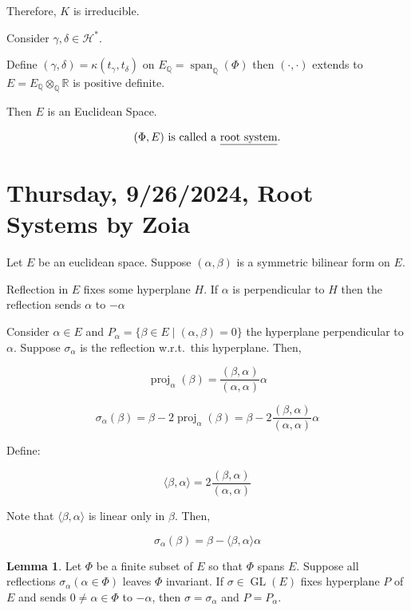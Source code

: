 \documentclass{article}
\theoremstyle{definition}
\newtheorem{lemma}[theorem]{Lemma}
\renewcommand{\span}{\operatorname{span}}
\begin{document}
Therefore, \(K\) is irreducible.

Consider \(\gamma , \delta \in \mathcal{H} ^{\ast}\).

Define \((\gamma , \delta) = \kappa (t_\gamma , t_\delta)\) on \(E_\mathbb{Q} = \span_\mathbb{Q} (\Phi)\) then \((\cdot,\cdot)\) extends to \(E = E_\mathbb{Q} \otimes _\mathbb{Q} \mathbb{R} \) is positive definite.

Then \(E\) is an Euclidean Space.

\[
    (\Phi, E) \text{ is called a \underline{root system}}.
\]

\newpage

\section{Thursday, 9/26/2024, Root Systems by Zoia}

Let \(E\) be an euclidean space. Suppose \((\alpha ,\beta)\) is a symmetric bilinear form on \(E\).

Reflection in \(E\) fixes some hyperplane \(H\). If \(\alpha\) is perpendicular to \(H\) then the reflection sends \(\alpha\) to \(-\alpha\) 

Consider \(\alpha \in E\) and \(P_\alpha = \{ \beta \in E \mid (\alpha , \beta) = 0 \} \) the hyperplane perpendicular to \(\alpha\). Suppose \(\sigma_\alpha\) is the reflection w.r.t.\ this hyperplane. Then,

\[
    \operatorname{proj}_\alpha (\beta) = \frac{(\beta , \alpha)}{(\alpha , \alpha)}\alpha 
\]

\[
    \sigma_\alpha (\beta) = \beta - 2 \operatorname{proj}_\alpha(\beta) = \beta - 2\frac{(\beta,\alpha)}{(\alpha ,\alpha)}\alpha
\]

Define:

\[
    \langle \beta , \alpha  \rangle = 2 \frac{(\beta,\alpha)}{(\alpha,\alpha)}
\]

Note that \(\langle \beta ,\alpha  \rangle \) is linear only in \(\beta \). Then, 

\[
    \sigma_\alpha (\beta) = \beta - \langle \beta ,\alpha  \rangle \alpha 
\]

\begin{lemma}
    Let \(\Phi\) be a finite subset of \(E\) so that \(\Phi\) spans \(E\). Suppose all reflections \(\sigma_\alpha (\alpha \in \Phi)\) leaves \(\Phi\) invariant. If \(\sigma\in \operatorname{GL}(E)\) fixes hyperplane \(P\) of \(E\) and sends \(0 \neq \alpha \in \Phi\) to \(-\alpha\), then \(\sigma = \sigma_\alpha\) and \(P = P_\alpha\).
\end{lemma}
\end{document}
